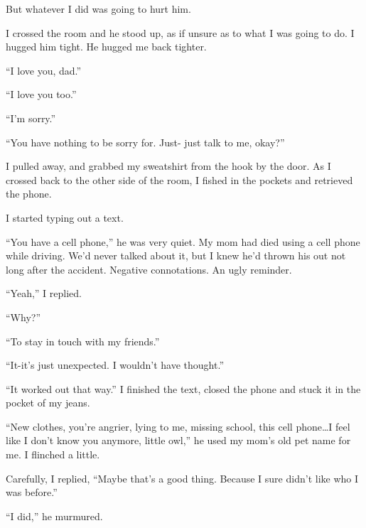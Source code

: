 But whatever I did was going to hurt him.



I crossed the room and he stood up, as if unsure as to what I was going to do.  I hugged him tight.  He hugged me back tighter.



``I love you, dad.''



``I love you too.''



``I'm sorry.''



``You have nothing to be sorry for.  Just- just talk to me, okay?''



I pulled away, and grabbed my sweatshirt from the hook by the door.  As I crossed back to the other side of the room, I fished in the pockets and retrieved the phone.



I started typing out a text.



``You have a cell phone,'' he was very quiet.  My mom had died using a cell phone while driving.  We'd never talked about it, but I knew he'd thrown his out not long after the accident.  Negative connotations.  An ugly reminder.



``Yeah,'' I replied.



``Why?''



``To stay in touch with my friends.''



``It-it's just unexpected.  I wouldn't have thought.''



``It worked out that way.''  I finished the text, closed the phone and stuck it in the pocket of my jeans.



``New clothes, you're angrier, lying to me, missing school, this cell phone\ldots I feel like I don't know you anymore, little owl,'' he used my mom's old pet name for me.  I flinched a little.



Carefully, I replied, ``Maybe that's a good thing.  Because I sure didn't like who I was before.''



``I did,'' he murmured.



